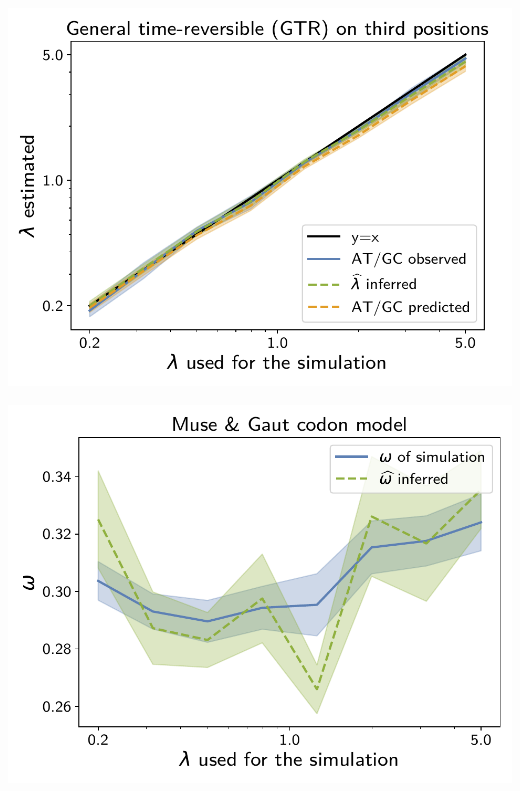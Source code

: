 \documentclass{article}
\begin{document}
\begin{center}
\begin{minipage}{0.325\linewidth}
    \end{minipage}
    \hfill
    \begin{minipage}{0.325\linewidth}
        \includegraphics[width=\linewidth, page=1]{inference_supp_mat/PrimatesExons2Mu1.0_lambda_GTR.pdf}
    \end{minipage}
    \hfill
    \begin{minipage}{0.325\linewidth}
        \includegraphics[width=\linewidth, page=1]{inference_supp_mat/PrimatesExons2Mu1.0_omega_MG.pdf}
    \end{minipage}

\end{center}
\end{document}
